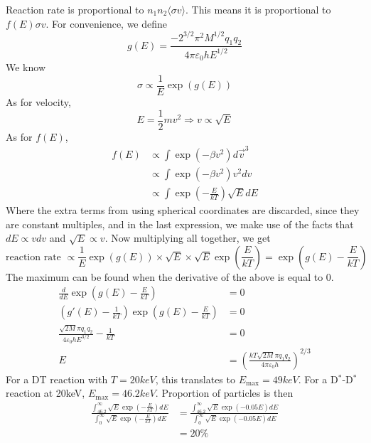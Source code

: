 \documentclass[answers]{exam}
\begin{document}
\begin{questions}
\begin{solution}
    Reaction rate is proportional to $n_1n_2\langle \sigma v \rangle$. This means it is proportional to $f(E) \sigma v$. For convenience, we define
    $$g(E) = \frac{-2^{3/2}\pi^2M^{1/2}q_1q_2}{4\pi\varepsilon_0hE^{1/2}}$$
    We know
    $$\sigma \propto \frac{1}{E} \exp(g(E))$$
    As for velocity,
    $$E = \frac{1}{2}mv^2 \Rightarrow v \propto \sqrt{E}$$
    As for $f(E)$,
    \begin{align*}
        f(E) &\propto \int \exp(-\beta v^2) d\vec v^3 \\
             &\propto \int \exp(-\beta v^2) v^2 dv \\
             &\propto \int \exp\left(-\frac{E}{kT}\right) \sqrt{E} dE
    \end{align*}
    Where the extra terms from using spherical coordinates are discarded, since they are constant multiples, and in the last expression, we make use of the facts that $dE \propto vdv$ and $\sqrt{E} \propto v$. Now multiplying all together, we get
    $$\text{reaction rate } \propto \frac{1}{E} \exp(g(E)) \times \sqrt{E} \times \sqrt{E} \exp\left(\frac{E}{kT}\right) = \exp\left(g(E) - \frac{E}{kT}\right)$$
    The maximum can be found when the derivative of the above is equal to 0.
    \begin{align*}
        \frac{d}{dE} \exp\left(g(E) - \frac{E}{kT}\right) &= 0 \\
        (g'(E) - \frac{1}{kT})\exp\left(g(E) - \frac{E}{kT}\right) &= 0 \\
        \frac{\sqrt{2M}\pi q_1q_2}{4\varepsilon_0hE^{3/2}} - \frac{1}{kT} &= 0 \\
        E &= \left(\frac{kT\sqrt{2M}\pi q_1q_2}{4\pi\varepsilon_0h}\right)^{2/3}
    \end{align*}
    For a DT reaction with $T = 20\unit{keV}$, this translates to $E_{\text{max}} = 49\unit{keV}$.
    For a D$^*$-D$^*$ reaction at 20keV, $E_{\text{max}} = 46.2\unit{keV}$. Proportion of particles is then
    \begin{align*}
        \frac{\int_{46.2}^\infty \sqrt{E}\exp\left(-\frac{E}{kT}\right)dE}{\int_0^\infty \sqrt{E}\exp\left(-\frac{E}{kT}\right)dE} &= \frac{\int_{46.2}^\infty \sqrt{E} \exp(-0.05E)dE}{\int_0^\infty \sqrt{E} \exp(-0.05E)dE} \\
                                                                                                                                   &= 20\%
    \end{align*}
\end{solution}


\end{questions}
\end{document}
